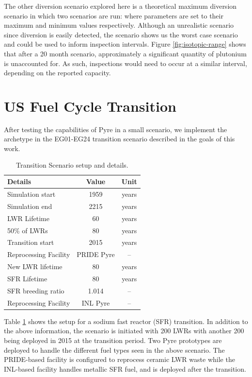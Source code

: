 The other diversion scenario explored here is a theoretical maximum diversion scenario in which two scenarios are run: where parameters are set to their maximum and minimum values
respectively. Although an unrealistic scenario since diversion is easily detected, the scenario shows us the worst case scenario and could be used to inform inspection intervals.
Figure \ref{fig:isotopic-range} shows that after a 20 month scenario, approximately a significant quantity of plutonium is unaccounted for. As such, inspections would need to occur
at a similar interval, depending on the reported capacity.

\section{US Fuel Cycle Transition}

After testing the capabilities of Pyre in a small scenario, we implement the archetype in the EG01-EG24 transition scenario described in the goals of this work. 

\begin{table}[h]
	\centering
	\begin{tabularx}{0.5\linewidth}{lcc}
		\hline
		\textbf{Details} & \textbf{Value} & \textbf{Unit} \\
		\hline \hline
		Simulation start & 1959 & years \\ \hline
		Simulation end & 2215 & years \\ \hline
		LWR Lifetime & 60 & years \\ 
		50\% of LWRs & 80 & years \\ \hline
		Transition start & 2015 & years \\ \hline
		Reprocessing Facility & PRIDE Pyre & -- \\ \hline
		New LWR lifetime & 80 & years \\ \hline
		SFR Lifetime & 80 & years \\ \hline
		SFR breeding ratio & 1.014 & -- \\ \hline
		Reprocessing Facility & INL Pyre & -- \\ \hline
	\end{tabularx}
	\caption {Transition Scenario setup and details.}
	\label {tab:setup}
\end{table}

Table \ref{tab:setup} shows the setup for a sodium fast reactor (SFR) transition. In addition to the above information, the scenario is initiated with 200 LWRs with another 200 being deployed
in 2015 at the transition period. Two Pyre prototypes are deployed to handle the different fuel types seen in the above scenario. The PRIDE-based facility is configured to reprocess ceramic
LWR waste while the INL-based facility handles metallic SFR fuel, and is deployed after the transition. 

